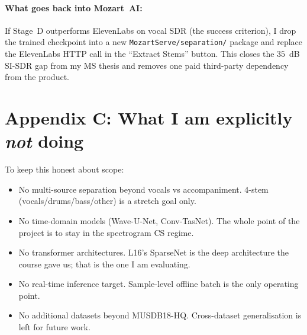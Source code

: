 \documentclass[10pt]{article}
\begin{document}
\paragraph{What goes back into Mozart~AI:}
If Stage~D outperforms ElevenLabs on vocal SDR (the success criterion),
I drop the trained checkpoint into a new
\texttt{MozartServe/separation/} package and replace the ElevenLabs
HTTP call in the ``Extract Stems'' button.  This closes the
$35$~dB SI-SDR gap from my MS thesis and removes one paid third-party
dependency from the product.

\section{Appendix C: What I am explicitly \emph{not} doing}
To keep this honest about scope:
\begin{itemize}
\item No multi-source separation beyond vocals vs accompaniment.  4-stem
(vocals/drums/bass/other) is a stretch goal only.
\item No time-domain models (Wave-U-Net, Conv-TasNet).  The whole point
of the project is to stay in the spectrogram CS regime.
\item No transformer architectures.  L16's SparseNet is the deep
architecture the course gave us; that is the one I am evaluating.
\item No real-time inference target.  Sample-level offline batch is
the only operating point.
\item No additional datasets beyond MUSDB18-HQ.  Cross-dataset
generalisation is left for future work.
\end{itemize}
\end{document}
